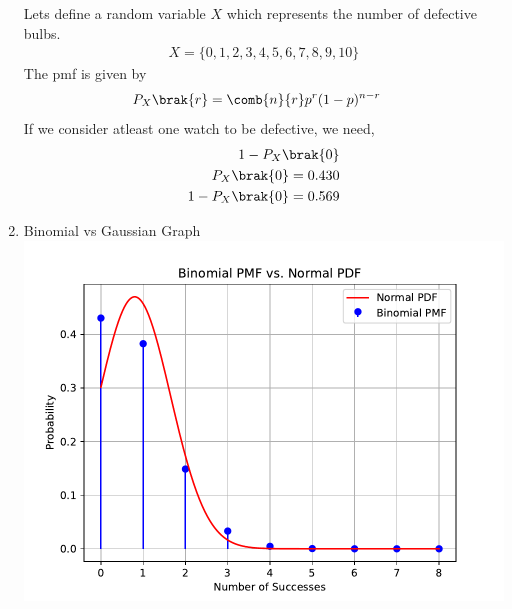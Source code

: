 \documentclass[journal,12pt,onecolumn]{IEEEtran}
\begin{document}
\begin{enumerate}[label=(\roman*)]
Lets define a random variable $X$ which represents the number of defective bulbs.
\begin{align}
X = \{0,1,2,3,4,5,6,7,8,9,10\}
\end{align}
The pmf is given by 
\begin{align} 
P_X\brak{r} &= \comb{n}{r} p^{r}(1-p)^{n-r}
\end{align}
If we consider atleast one watch to be defective, we need, 
\begin{align}
1 - P_X\brak{0}\\
P_X\brak{0} = 0.430\\
1 - P_X\brak{0} = 0.569
\end{align}
\item Binomial vs Gaussian Graph\\
\includegraphics[width=\columnwidth]{./figs/plot.pdf}
\end{enumerate}
\end{document}
